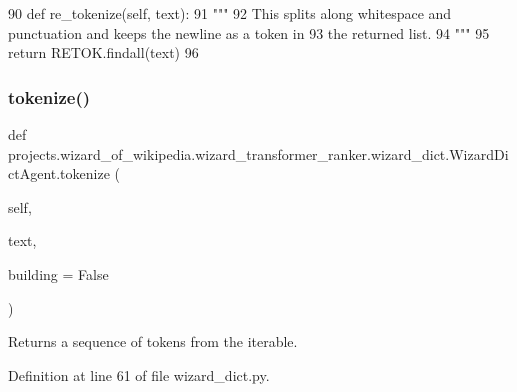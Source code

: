 \begin{DoxyCode}
90     \textcolor{keyword}{def }re\_tokenize(self, text):
91         \textcolor{stringliteral}{"""}
92 \textcolor{stringliteral}{        This splits along whitespace and punctuation and keeps the newline as a token in}
93 \textcolor{stringliteral}{        the returned list.}
94 \textcolor{stringliteral}{        """}
95         \textcolor{keywordflow}{return} RETOK.findall(text)
96 \end{DoxyCode}
\mbox{\label{classprojects_1_1wizard__of__wikipedia_1_1wizard__transformer__ranker_1_1wizard__dict_1_1WizardDictAgent_a314852ee65380b494e078d51d73c0767}} 
\subsubsection{\texorpdfstring{tokenize()}{tokenize()}}
{\footnotesize\ttfamily def projects.\+wizard\+\_\+of\+\_\+wikipedia.\+wizard\+\_\+transformer\+\_\+ranker.\+wizard\+\_\+dict.\+Wizard\+Dict\+Agent.\+tokenize (\begin{DoxyParamCaption}\item[{}]{self,  }\item[{}]{text,  }\item[{}]{building = {\ttfamily False} }\end{DoxyParamCaption})}

\begin{DoxyVerb}Returns a sequence of tokens from the iterable.
\end{DoxyVerb}
 

Definition at line 61 of file wizard\+\_\+dict.\+py.


